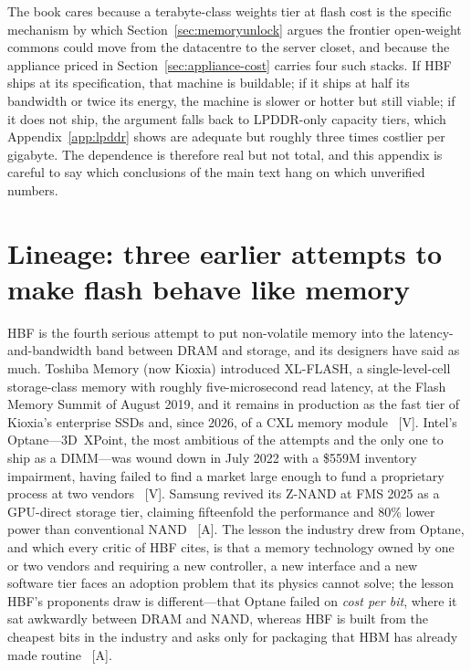 The book cares because a terabyte-class weights tier at flash cost is the specific mechanism by which Section~\ref{sec:memoryunlock} argues the frontier open-weight commons could move from the datacentre to the server closet, and because the appliance priced in Section~\ref{sec:appliance-cost} carries four such stacks. If HBF ships at its specification, that machine is buildable; if it ships at half its bandwidth or twice its energy, the machine is slower or hotter but still viable; if it does not ship, the argument falls back to LPDDR-only capacity tiers, which Appendix~\ref{app:lpddr} shows are adequate but roughly three times costlier per gigabyte. The dependence is therefore real but not total, and this appendix is careful to say which conclusions of the main text hang on which unverified numbers.

\section{Lineage: three earlier attempts to make flash behave like memory}

HBF is the fourth serious attempt to put non-volatile memory into the latency-and-bandwidth band between DRAM and storage, and its designers have said as much. Toshiba Memory (now Kioxia) introduced XL-FLASH, a single-level-cell storage-class memory with roughly five-microsecond read latency, at the Flash Memory Summit of August 2019, and it remains in production as the fast tier of Kioxia's enterprise SSDs and, since 2026, of a CXL memory module~\cite{hbf-xlflash} [V]. Intel's Optane---3D~XPoint, the most ambitious of the attempts and the only one to ship as a DIMM---was wound down in July 2022 with a \$559M inventory impairment, having failed to find a market large enough to fund a proprietary process at two vendors~\cite{hbf-optane} [V]. Samsung revived its Z-NAND at FMS 2025 as a GPU-direct storage tier, claiming fifteenfold the performance and 80\% lower power than conventional NAND~\cite{hbf-znand} [A]. The lesson the industry drew from Optane, and which every critic of HBF cites, is that a memory technology owned by one or two vendors and requiring a new controller, a new interface and a new software tier faces an adoption problem that its physics cannot solve; the lesson HBF's proponents draw is different---that Optane failed on \emph{cost per bit}, where it sat awkwardly between DRAM and NAND, whereas HBF is built from the cheapest bits in the industry and asks only for packaging that HBM has already made routine~\cite{hbf-optane-analogy} [A].

